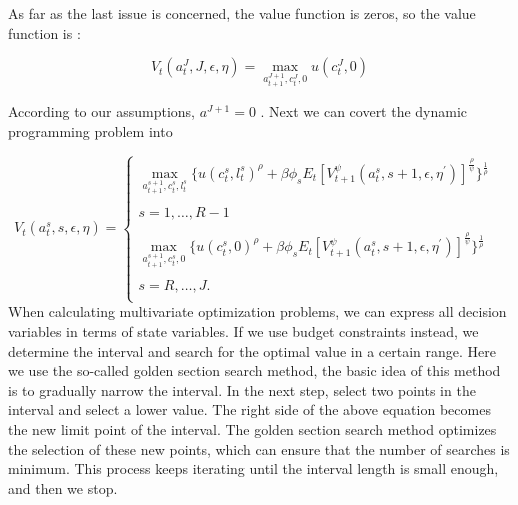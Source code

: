 \documentclass{article}
\begin{document}
    As far as the last issue is concerned, the value function is zeros, so the value function is :

    \begin{equation}
        V_t(a_t^J,J,\epsilon,\eta)=\max_{a_{t+1}^{J+1},c_t^J,0}u(c_t^J,0)
    \end{equation}    

    According to our assumptions, $a^{J+1}=0$ . Next we can covert the dynamic programming problem into 


    \begin{equation}
        V_t(a_t^s,s,\epsilon,\eta)=\begin{cases}
            \max_{a_{t+1}^{s+1},c_t^s,l_t^s}
            \Big\{u(c_t^s,l_t^s)^{\rho}+\beta\phi_sE_t[V_{t+1}^\psi(a_t^s,s+1,\epsilon,\eta^{'})]^{\frac{\rho}{\psi}}\Big\}
            ^{\frac{1}{\rho}}& \\
            \\
            s=1,\dots,R-1\\
            \\
            \max_{a_{t+1}^{s+1},c_t^s,0}
            \Big\{u(c_t^s,0)^{\rho}+\beta\phi_sE_t[V_{t+1}^\psi(a_t^s,s+1,\epsilon,\eta^{'})]^{\frac{\rho}{\psi}}\Big\}
            ^{\frac{1}{\rho}}& \\
            \\
            s=R,\dots,J.
            \\
        \end{cases}
    \end{equation}
    When calculating multivariate optimization problems, we can express all decision variables in terms of state variables. 
    If we use budget constraints instead, we determine the interval and search for the optimal value in a certain range. 
    Here we use the so-called golden section search method, the basic idea of this method is to gradually narrow the interval. 
    In the next step, select two points in the interval and select a lower value. The right side of the above equation becomes 
    the new limit point of the interval. The golden section search method optimizes the selection of these new points, 
    which can ensure that the number of searches is minimum. This process keeps iterating until the interval length is small enough, 
    and then we stop. 
    
\end{document}
